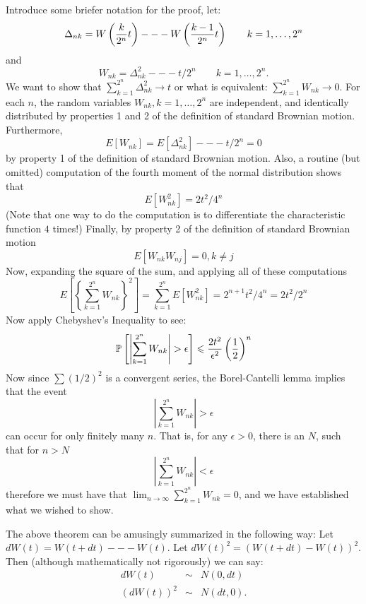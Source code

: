 \begin{solution}
\begin{solution}
\begin{solution}
\begin{solution}
\begin{solution}
\begin{solution}
\begin{solution}
\begin{solution}
\begin{solution}
\begin{solution}
{\begin{problem}
\end{problem} 
\begin{solution} 
Introduce some briefer notation for the proof, let:
$$
  \Dt_{nk} = 
                W\left( \frac{k}{2^n} t \right) --- 
                W\left( \frac{k-1}{2^n} t \right)
        \qquad k = 1, \ldots, 2^n
$$
and
$$
  W_{nk} = \Delta^{2}_{nk} --- t/2^n \qquad k = 1, \ldots, 2^n.
$$
We want to show that $\sum_{k=1}^{2^n} \Delta^2_{nk} \to t$ or what
is equivalent: $\sum_{k=1}^{2^n} W_{nk} \to 0$.  For each $n$, the
random variables $W_{nk}, k = 1, \ldots, 2^n$ are independent, and
identically distributed by properties 1 and 2 of the definition of
standard Brownian motion.  Furthermore,
$$
  E[ W_{nk} ] = E[ \Delta_{nk}^2 ] --- t/2^n = 0
$$
by property 1 of the definition of standard Brownian motion.  Also, a
routine (but omitted) 
computation of the fourth moment of the normal distribution
shows that
$$
  E[W^2_{nk} ] = 2t^2/4^n
$$
(Note that one way to do the computation is to differentiate the
characteristic function $4$ times!)
Finally, by property 2 of the definition of standard Brownian motion
$$
  E[ W_{nk}W_{nj} ] = 0, k \ne j
$$
Now, expanding the square of the sum, and applying all of these
computations
$$
  E\left[ \left\{ \sum_{k=1}^{2^n} W_{nk} \right\}^2 \right] =
  \sum_{k=1}^{2^n} E[W^2_{nk}] = 2^{n+1}t^2/4^n = 2t^2/2^n
$$
Now apply Chebyshev's Inequality to see:
$$
  \P\left[ \left| \sum_{k=1}^{2^n} W_{nk} \right| > \epsilon \right]
   \le \frac{2 t^2}{\epsilon^2} \left( \frac{1}{2}
  \right)^n
$$
Now since $\sum (1/2)^2$ is a convergent series, the Borel-Cantelli
lemma implies that the event
$$
  \left| \sum_{k=1}^{2^n} W_{nk} \right| > \epsilon
$$
can occur for only finitely many $n$.  That is, for any $\epsilon >
0$, there is an $N$, such that for $n > N$
$$
  \left| \sum_{k=1}^{2^n} W_{nk} \right| < \epsilon
$$
therefore we must have that 
$\lim_{n \to \infty} \sum_{k=1}^{2^n} W_{nk} = 0$, 
and we have established what we
wished to show.
\end{solution}

\begin{problem}
 The above theorem can be amusingly summarized in the following
  way:  Let $dW(t) = W(t + dt) --- W(t)$.  Let $dW(t)^2 = ( W(t + dt) -
  W(t) )^2.$  Then (although mathematically not rigorously) we can say:
  \begin{eqnarray*}
     dW(t) &\sim& N(0, dt) \\
     (dW(t))^2 &\sim& N(dt, 0). \\
  \end{eqnarray*}


\end{problem}}
\end{solution}
\end{solution}
\end{solution}
\end{solution}
\end{solution}
\end{solution}
\end{solution}
\end{solution}
\end{solution}
\end{solution}

